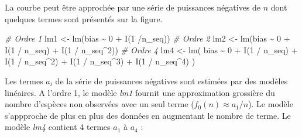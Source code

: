 \documentclass[
  11pt,
  american,
  a4paper,
  extrafontsizes,onecolumn,openright
  ]{memoir}
\newenvironment{Shaded}{\begin{snugshade}}{\end{snugshade}}
\newcommand{\CommentTok}[1]{\textcolor[rgb]{0.56,0.35,0.01}{\textit{#1}}}
\newcommand{\DecValTok}[1]{\textcolor[rgb]{0.00,0.00,0.81}{#1}}
\newcommand{\FunctionTok}[1]{\textcolor[rgb]{0.00,0.00,0.00}{#1}}
\newcommand{\NormalTok}[1]{#1}
\newcommand{\OtherTok}[1]{\textcolor[rgb]{0.56,0.35,0.01}{#1}}
\newcommand{\SpecialCharTok}[1]{\textcolor[rgb]{0.00,0.00,0.00}{#1}}
\begin{document}
La courbe peut être approchée par une série de puissances négatives de \(n\) dont quelques termes sont présentés sur la figure.

\scriptsize

\begin{Shaded}
\begin{Highlighting}[]
\CommentTok{\# Ordre 1}
\NormalTok{lm1 }\OtherTok{\textless{}{-}} \FunctionTok{lm}\NormalTok{(bias }\SpecialCharTok{\textasciitilde{}} \DecValTok{0} \SpecialCharTok{+} \FunctionTok{I}\NormalTok{(}\DecValTok{1}  \SpecialCharTok{/}\NormalTok{n\_seq))}
\CommentTok{\# Ordre 2}
\NormalTok{lm2 }\OtherTok{\textless{}{-}} \FunctionTok{lm}\NormalTok{(bias }\SpecialCharTok{\textasciitilde{}} \DecValTok{0} \SpecialCharTok{+} \FunctionTok{I}\NormalTok{(}\DecValTok{1} \SpecialCharTok{/}\NormalTok{ n\_seq) }\SpecialCharTok{+} \FunctionTok{I}\NormalTok{(}\DecValTok{1} \SpecialCharTok{/}\NormalTok{ n\_seq}\SpecialCharTok{\^{}}\DecValTok{2}\NormalTok{))}
\CommentTok{\# Ordre 4}
\NormalTok{lm4 }\OtherTok{\textless{}{-}} \FunctionTok{lm}\NormalTok{(}
\NormalTok{  bias }\SpecialCharTok{\textasciitilde{}} \DecValTok{0} \SpecialCharTok{+} \FunctionTok{I}\NormalTok{(}\DecValTok{1} \SpecialCharTok{/}\NormalTok{ n\_seq) }\SpecialCharTok{+} \FunctionTok{I}\NormalTok{(}\DecValTok{1} \SpecialCharTok{/}\NormalTok{ n\_seq}\SpecialCharTok{\^{}}\DecValTok{2}\NormalTok{) }\SpecialCharTok{+} \FunctionTok{I}\NormalTok{(}\DecValTok{1} \SpecialCharTok{/}\NormalTok{ n\_seq}\SpecialCharTok{\^{}}\DecValTok{3}\NormalTok{) }\SpecialCharTok{+} \FunctionTok{I}\NormalTok{(}\DecValTok{1} \SpecialCharTok{/}\NormalTok{ n\_seq}\SpecialCharTok{\^{}}\DecValTok{4}\NormalTok{)}
\NormalTok{)}
\end{Highlighting}
\end{Shaded}

\normalsize

Les termes \(a_i\) de la série de puissances négatives sont estimées par des modèles linéaires.
A l'ordre 1, le modèle \emph{lm1} fournit une approximation grossière du nombre d'espèces non observées avec un seul terme (\(f_0(n) \approx a_1 / n\)).
Le modèle s'appproche de plus en plus des données en augmentant le nombre de terme.
Le modèle \emph{lm4} contient 4 termes \(a_1\) à \(a_4\) :

\scriptsize

\begin{Shaded}
\end{Shaded}
\end{document}
